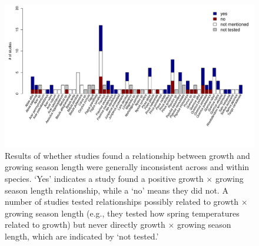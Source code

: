 \documentclass[11pt]{article}
\begin{document}
\clearpage
\begin{figure}[h!]
\includegraphics[width=1\textwidth]{..//figures/speciesnums_finds.pdf}
\caption{Results of whether studies found a relationship between growth and growing season length were generally inconsistent across  and within species. `Yes' indicates a study found a positive growth $\times$ growing season length relationship, while a `no' means they did not. A number of studies tested relationships possibly related to growth $\times$ growing season length (e.g., they tested how spring temperatures related to growth) but never directly growth $\times$ growing season length, which are indicated by `not tested.'}
\label{fig:sppfinds}
\end{figure}
\end{document}
